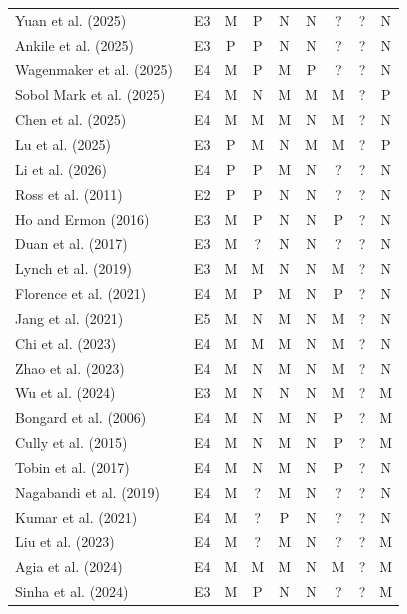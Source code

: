 \documentclass[10pt,a4paper]{article}
\begin{document}
\begin{longtable}{@{}>{\raggedright\arraybackslash}p{5.5cm}cccccccc@{}}
Yuan et al. (2025)~\cite{Yuan2025} & E3 & M & P & N & N & ? & ? & N \\
Ankile et al. (2025)~\cite{Ankile2025} & E3 & P & P & N & N & ? & ? & N \\
Wagenmaker et al. (2025)~\cite{Wagenmaker2025} & E4 & M & P & M & P & ? & ? & N \\
Sobol Mark et al. (2025)~\cite{Mark2025} & E4 & M & N & M & M & M & ? & P \\
Chen et al. (2025)~\cite{Chen2025} & E4 & M & M & M & N & M & ? & N \\
Lu et al. (2025)~\cite{Lu2025} & E3 & P & M & N & M & M & ? & P \\
Li et al. (2026)~\cite{Li2026} & E4 & P & P & M & N & ? & ? & N \\
Ross et al. (2011)~\cite{Ross2011} & E2 & P & P & N & N & ? & ? & N \\
Ho and Ermon (2016)~\cite{Ho2016} & E3 & M & P & N & N & P & ? & N \\
Duan et al. (2017)~\cite{Duan2017} & E3 & M & ? & N & N & ? & ? & N \\
Lynch et al. (2019)~\cite{Lynch2019} & E3 & M & M & N & N & M & ? & N \\
Florence et al. (2021)~\cite{Florence2021} & E4 & M & P & M & N & P & ? & N \\
Jang et al. (2021)~\cite{Jang2021} & E5 & M & N & M & N & M & ? & N \\
Chi et al. (2023)~\cite{Chi2023} & E4 & M & M & M & N & M & ? & N \\
Zhao et al. (2023)~\cite{Zhao2023} & E4 & M & N & M & N & M & ? & N \\
Wu et al. (2024)~\cite{Wu2024} & E3 & M & N & N & N & M & ? & M \\
Bongard et al. (2006)~\cite{Bongard2006} & E4 & M & N & M & N & P & ? & M \\
Cully et al. (2015)~\cite{Cully2015} & E4 & M & N & M & N & P & ? & M \\
Tobin et al. (2017)~\cite{Tobin2017} & E4 & M & N & M & N & P & ? & N \\
Nagabandi et al. (2019)~\cite{Nagabandi2019} & E4 & M & ? & M & N & ? & ? & N \\
Kumar et al. (2021)~\cite{Kumar2021} & E4 & M & ? & P & N & ? & ? & N \\
Liu et al. (2023)~\cite{Liu2023c} & E4 & M & ? & M & N & ? & ? & M \\
Agia et al. (2024)~\cite{Agia2024} & E4 & M & M & M & N & M & ? & M \\
Sinha et al. (2024)~\cite{Sinha2024} & E3 & M & P & N & N & ? & ? & M \\

\end{longtable}
\end{document}
